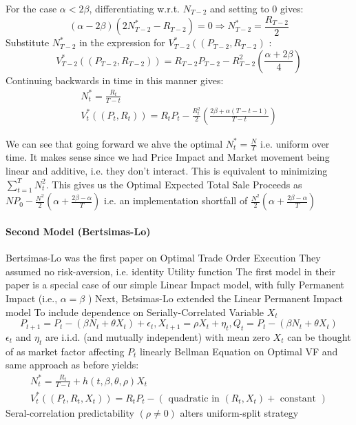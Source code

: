 \documentclass[11pt]{article}
\begin{document}
For the case $\alpha<2 \beta$, differentiating w.r.t. $N_{T-2}$ and setting to 0 gives:
$$
(\alpha-2 \beta)\left(2 N_{T-2}^*-R_{T-2}\right)=0 \Rightarrow N_{T-2}^*=\frac{R_{T-2}}{2}
$$
Substitute $N_{T-2}^*$ in the expression for $V_{T-2}^*\left(\left(P_{T-2}, R_{T-2}\right)\right.$ :
$$
V_{T-2}^*\left(\left(P_{T-2}, R_{T-2}\right)\right)=R_{T-2} P_{T-2}-R_{T-2}^2\left(\frac{\alpha+2 \beta}{4}\right)
$$
Continuing backwards in time in this manner gives:
$$
\begin{gathered}
N_t^*=\frac{R_t}{T-t} \\
V_t^*\left(\left(P_t, R_t\right)\right)=R_t P_t-\frac{R_t^2}{2}\left(\frac{2 \beta+\alpha(T-t-1)}{T-t}\right)
\end{gathered}
$$

We can see that going forward we ahve the optimal $N^*_t = \frac{N}{T}$ i.e. uniform over time. It makes sense since we had Price Impact and Market movement being linear and additive, i.e. they don't interact. 
This is equivalent to minimizing $\sum_{t=1}^T N^2_t$. 
This gives us the Optimal Expected Total Sale Proceeds as $NP_0 - \frac{N^2}{2}(\alpha + \frac{2\beta - \alpha}{T})$ i.e. an implementation shortfall of $\frac{N^2}{2}(\alpha + \frac{2\beta - \alpha}{T})$

\paragraph*{Second Model (Bertsimas-Lo)}
Bertsimas-Lo was the first paper on Optimal Trade Order Execution They assumed no risk-aversion, i.e. identity Utility function The first model in their paper is a special case of our simple Linear Impact model, with fully Permanent Impact (i.e., $\alpha=\beta$ )
Next, Betsimas-Lo extended the Linear Permanent Impact model
To include dependence on Serially-Correlated Variable $X_t$
$$
P_{t+1}=P_t-\left(\beta N_t+\theta X_t\right)+\epsilon_t, X_{t+1}=\rho X_t+\eta_t, Q_t=P_t-\left(\beta N_t+\theta X_t\right)
$$
$\epsilon_t$ and $\eta_t$ are i.i.d. (and mutually independent) with mean zero
$X_t$ can be thought of as market factor affecting $P_t$ linearly
Bellman Equation on Optimal VF and same approach as before yields:
$$
\begin{gathered}
N_t^*=\frac{R_t}{T-t}+h(t, \beta, \theta, \rho) X_t \\
V_t^*\left(\left(P_t, R_t, X_t\right)\right)=R_t P_t-\left(\text { quadratic in }\left(R_t, X_t\right)+\text { constant }\right)
\end{gathered}
$$
Seral-correlation predictability $(\rho \neq 0)$ alters uniform-split strategy
\end{document}
